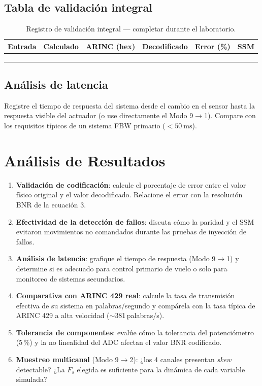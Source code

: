 \documentclass[11pt]{article}
\begin{document}
\subsection{Tabla de validación integral}
\begin{table}[H]\centering
\caption{Registro de validación integral — completar durante el laboratorio.}
\begin{tabular}{lccccc}
\toprule
Entrada & Calculado & ARINC (hex) & Decodificado & Error (\%) & SSM \\
\midrule
 & & & & & \\
 & & & & & \\
 & & & & & \\
\bottomrule
\end{tabular}
\end{table}

\subsection{Análisis de latencia}
Registre el tiempo de respuesta del sistema desde el cambio en el sensor hasta la
respuesta visible del actuador (o use directamente el Modo 9$\to$1). Compare con los
requisitos típicos de un sistema FBW primario ($<\SI{50}{\milli\second}$).

\section{Análisis de Resultados}
\begin{enumerate}
  \item \textbf{Validación de codificación}: calcule el porcentaje de error entre el
        valor físico original y el valor decodificado. Relacione el error con la
        resolución BNR de la ecuación 3.
  \item \textbf{Efectividad de la detección de fallos}: discuta cómo la paridad y el
        SSM evitaron movimientos no comandados durante las pruebas de inyección de
        fallos.
  \item \textbf{Análisis de latencia}: grafique el tiempo de respuesta (Modo 9$\to$1) y
        determine si es adecuado para control primario de vuelo o solo para monitoreo de
        sistemas secundarios.
  \item \textbf{Comparativa con ARINC 429 real}: calcule la tasa de transmisión efectiva
        de su sistema en palabras/segundo y compárela con la tasa típica de ARINC 429 a
        alta velocidad ($\sim$381\,palabras/s).
  \item \textbf{Tolerancia de componentes}: evalúe cómo la tolerancia del potenciómetro
        (5\,\%) y la no linealidad del ADC afectan el valor BNR codificado.
  \item \textbf{Muestreo multicanal} (Modo 9$\to$2): ¿los 4 canales presentan
        \emph{skew} detectable? ¿La $F_s$ elegida es suficiente para la dinámica de
        cada variable simulada?
\end{enumerate}
\end{document}

